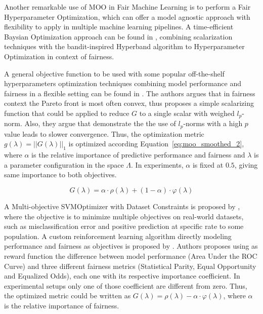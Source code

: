 Another remarkable use of MOO in Fair Machine Learning is to perform a Fair Hyperparameter Optimization, which can offer a model agnostic approach with flexibility to apply in multiple machine learning pipelines. A time-efficient Baysian Optimization approach can be found in \cite{Schmucker2020}, combining scalarization techniques with the bandit-inspired Hyperband \citep{Li2016} algorithm to Hyperparameter Optimization in context of fairness.

A general objective function to be used with some popular off-the-shelf hyperparameters optimization techniques combining model performance and fairness in a flexible setting can be found in \cite{Cruz2021}. The authors argues that in fairness context the Pareto front is most often convex, thus proposes a simple scalarizing function that could be applied to reduce $G$ to a single scalar with weighed $l_p$-norm. Also, they argue that \cite{GIAGKIOZIS2015338} demonstrate the the  use  of $l_p$-norms with a high $p$ value leads to slower convergence. Thus, the optimization metric $g(\lambda) = ||G(\lambda)||_1$ is optimized according Equation~\ref{eq:moo_smoothed_2}, where $\alpha$ is the relative importance of predictive performance and fairness and $\lambda$ is a parameter configuration in the space $\Lambda$. In experiments, $\alpha$ is fixed at $0.5$, giving same importance to both objectives.

\begin{equation} \label{eq:moo_smoothed_2}
    G(\lambda) = \alpha \cdot \rho(\lambda) + (1-\alpha) \cdot \varphi(\lambda)
\end{equation}

A Multi-objective SVMOptimizer with Dataset Constraints is proposed by \cite{Goh2016}, where the objective is to minimize multiple objectives on real-world datasets, such as misclassification error and positive prediction at specific rate to some population. A custom reinforcement learning algorithm directly modeling performance and fairness as objectives is proposed by \cite{Petrovic2021}. Authors proposes using as reward function the difference between model performance (Area Under the ROC Curve) and three different fairness metrics (Statistical Parity, Equal Opportunity and Equalized Odds), each one with its respective importance coefficient. In experimental setups only one of those coefficient are different from zero. Thus, the optimized metric could be written as $G(\lambda) = \rho(\lambda) - \alpha \cdot \varphi(\lambda)$, where $\alpha$ is the relative importance of fairness.


